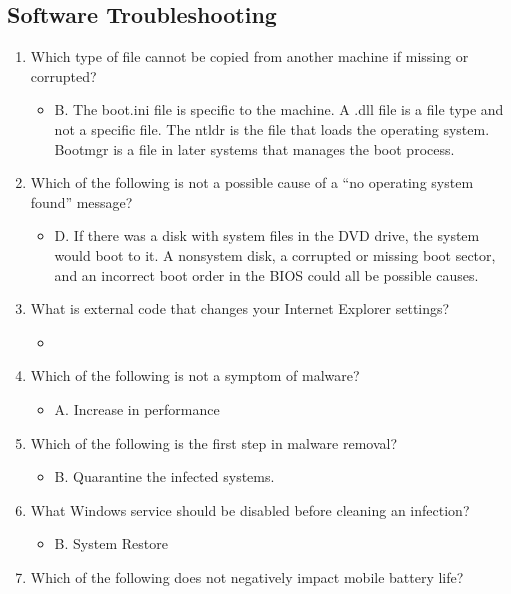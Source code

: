 \documentclass{article}
\begin{document}
\subsection{Software Troubleshooting} 
\begin{enumerate}
    \item Which type of file cannot be copied from another machine if missing or corrupted?
    \begin{itemize}
        \item B. The boot.ini file is specific to the machine. A .dll file is a file type and not a specific
file. The ntldr is the file that loads the operating system. Bootmgr is a file in later systems
that manages the boot process.
    \end{itemize}
    \item Which of the following is not a possible cause of a “no operating system found” message?
    \begin{itemize}
        \item D. If there was a disk with system files in the DVD drive, the system would boot to it.
A nonsystem disk, a corrupted or missing boot sector, and an incorrect boot order in the
BIOS could all be possible causes.
    \end{itemize}
    \item What is external code that changes your Internet Explorer settings?
    \begin{itemize}
        \item 
    \end{itemize}
    \item Which of the following is not a symptom of malware?
    \begin{itemize}
        \item A. Increase in performance
    \end{itemize}
    \item Which of the following is the first step in malware removal?
    \begin{itemize}
        \item B. Quarantine the infected systems.
    \end{itemize}
    \item What Windows service should be disabled before cleaning an infection?
    \begin{itemize}
        \item B. System Restore
    \end{itemize}
    \item Which of the following does not negatively impact mobile battery life?

\end{enumerate}
\end{document}
